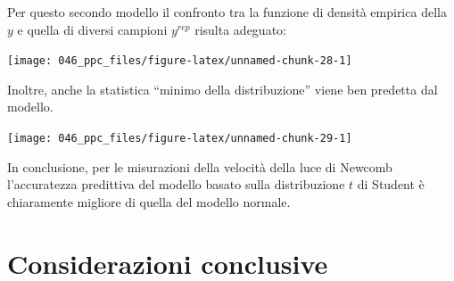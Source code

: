 \documentclass[
  10pt,
  italian,
  a4paper,
  extrafontsizes,onecolumn,openright
  ]{memoir}
\newenvironment{Shaded}{\begin{snugshade}}{\end{snugshade}}
\newcommand{\AttributeTok}[1]{\textcolor[rgb]{0.77,0.63,0.00}{#1}}
\newcommand{\DecValTok}[1]{\textcolor[rgb]{0.00,0.00,0.81}{#1}}
\newcommand{\FunctionTok}[1]{\textcolor[rgb]{0.00,0.00,0.00}{#1}}
\newcommand{\NormalTok}[1]{#1}
\newcommand{\OtherTok}[1]{\textcolor[rgb]{0.56,0.35,0.01}{#1}}
\newcommand{\SpecialCharTok}[1]{\textcolor[rgb]{0.00,0.00,0.00}{#1}}
\newcommand{\StringTok}[1]{\textcolor[rgb]{0.31,0.60,0.02}{#1}}
\begin{document}
\noindent
Per questo secondo modello il confronto tra la funzione di densità empirica della \(y\) e quella di diversi campioni \(y^{rep}\) risulta adeguato:

\begin{Shaded}
\end{Shaded}

\begin{center}\texttt{[image: 046\_ppc\_files/figure-latex/unnamed-chunk-28-1]} \end{center}

\noindent
Inoltre, anche la statistica ``minimo della distribuzione'' viene ben predetta dal modello.

\begin{Shaded}
\end{Shaded}

\begin{center}\texttt{[image: 046\_ppc\_files/figure-latex/unnamed-chunk-29-1]} \end{center}

\noindent
In conclusione, per le misurazioni della velocità della luce di Newcomb l'accuratezza predittiva del modello basato sulla distribuzione \(t\) di Student è chiaramente migliore di quella del modello normale.

\hypertarget{considerazioni-conclusive}{%
\section*{Considerazioni conclusive}\label{considerazioni-conclusive}}
\end{document}
